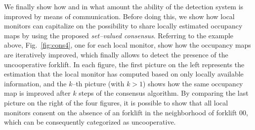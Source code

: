 \documentclass[journal, onecolumn, 12pt]{styles/IEEEtran}
\begin{document}

We finally show how and in what amount the ability of the detection system is improved by means of communication. Before doing this, we show how local monitors can capitalize on the possibility to share locally estimated occupancy maps by using the proposed {\em set--valued consensus}. Referring to the example above, Fig.~\ref{fig:cons4}, one for each local monitor, show how the occupancy maps are iteratively improved, which finally allows to detect the presence of the uncooperative forklift. In each figure, the first picture on the left represents the estimation that the local monitor has computed based on only locally available information, and the $k$--th picture (with $k>1$) shows how the same occupancy map is improved after $k$ steps of the consensus algorithm. By comparing the last picture on the right of the four figures, it is possible to show that all local monitors consent on the absence of an forklift in the neighborhood of forklift $00$, which can be consequently categorized as uncooperative.
\end{document}
